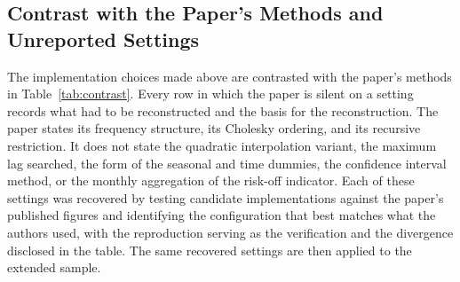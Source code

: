 \subsection{Contrast with the Paper's Methods and Unreported Settings}

The implementation choices made above are contrasted with the paper's methods in Table~\ref{tab:contrast}. Every row in which the paper is silent on a setting records what had to be reconstructed and the basis for the reconstruction. The paper states its frequency structure, its Cholesky ordering, and its recursive restriction. It does not state the quadratic interpolation variant, the maximum lag searched, the form of the seasonal and time dummies, the confidence interval method, or the monthly aggregation of the risk-off indicator. Each of these settings was recovered by testing candidate implementations against the paper's published figures and identifying the configuration that best matches what the authors used, with the reproduction serving as the verification and the divergence disclosed in the table. The same recovered settings are then applied to the extended sample.

